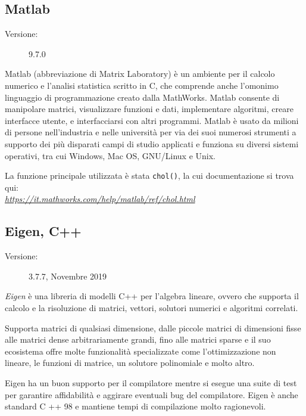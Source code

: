 \documentclass[preprint,12pt]{elsarticle}
\begin{document}
\subsection*{Matlab}
\medskip
\begin{description}
	\item[Versione:] 9.7.0
\end{description}

Matlab (abbreviazione di Matrix Laboratory) è un ambiente per il calcolo numerico e l'analisi statistica scritto in C, che comprende anche l'omonimo linguaggio di programmazione creato dalla MathWorks. Matlab consente di manipolare matrici, visualizzare funzioni e dati, implementare algoritmi, creare interfacce utente, e interfacciarsi con altri programmi. Matlab è usato da milioni di persone nell'industria e nelle università per via dei suoi numerosi strumenti a supporto dei più disparati campi di studio applicati e funziona su diversi sistemi operativi, tra cui Windows, Mac OS, GNU/Linux e Unix.

La funzione principale utilizzata è stata \texttt{chol()}, la cui documentazione si trova qui:\\
\textit{\href{https://it.mathworks.com/help/matlab/ref/chol.html}{https://it.mathworks.com/help/matlab/ref/chol.html}}

\subsection*{Eigen, C++}
\medskip
\begin{description}
	\item[Versione:] 3.7.7, Novembre 2019
\end{description}

\textit{Eigen} è una libreria di modelli C++ per l'algebra lineare, ovvero che supporta il calcolo e la risoluzione di matrici, vettori, solutori numerici e algoritmi correlati.

Supporta matrici di qualsiasi dimensione, dalle piccole matrici di dimensioni fisse alle matrici dense arbitrariamente grandi, fino alle matrici sparse e il suo ecosistema offre molte funzionalità specializzate come l'ottimizzazione non lineare, le funzioni di matrice, un solutore polinomiale e molto altro.

Eigen ha un buon supporto per il compilatore mentre si esegue una suite di test per garantire affidabilità e aggirare eventuali bug del compilatore. Eigen è anche standard C ++ 98 e mantiene tempi di compilazione molto ragionevoli.
\end{document}
